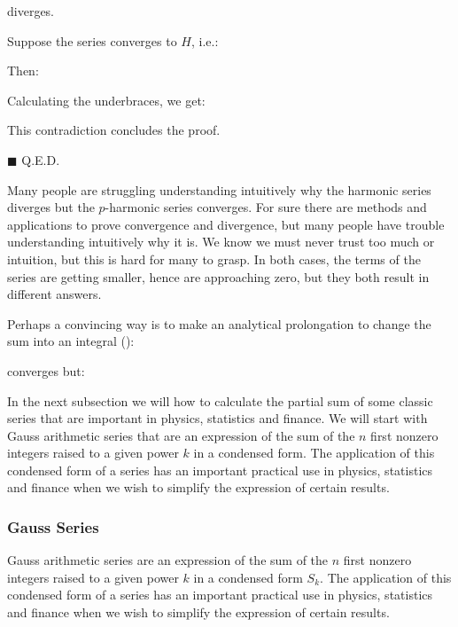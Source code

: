 	diverges.
	\begin{dem}
		Suppose the series converges to $H$, i.e.:
		
		Then:
		
		Calculating the underbraces, we get:
		
		This contradiction concludes the proof.	
		\begin{flushright}
			$\blacksquare$  Q.E.D.
		\end{flushright}
	\end{dem}
	\begin{tcolorbox}[title=Remark,colframe=black,arc=10pt]
	Many people are struggling understanding intuitively why the harmonic series diverges but the $p$-harmonic series converges. For sure there are methods and applications to prove convergence and divergence, but many people have trouble understanding intuitively why it is. We know we must never trust too much or intuition, but this is hard for many to grasp. In both cases, the terms of the series are getting smaller, hence are approaching zero, but they both result in different answers.
	
	Perhaps a convincing way is to make an analytical prolongation to change the sum into an integral ():
	
	converges but:
	
	\end{tcolorbox}
	
	In the next subsection we will how to calculate the partial sum of some classic series that are important in physics, statistics and finance. We will start with Gauss arithmetic series that are an expression of the sum of the $n$ first nonzero integers raised to a given power $k$ in a condensed form. The application of this condensed form of a series has an important practical use in physics, statistics and finance when we wish to simplify the expression of certain results.
	
	\subsubsection{Gauss Series}\label{gauss series}
	
	Gauss arithmetic series are an expression of the sum of the $n$ first nonzero integers raised to a given power $k$ in a condensed form $S_k$. The application of this condensed form of a series has an important practical use in physics, statistics and finance when we wish to simplify the expression of certain results.
	
